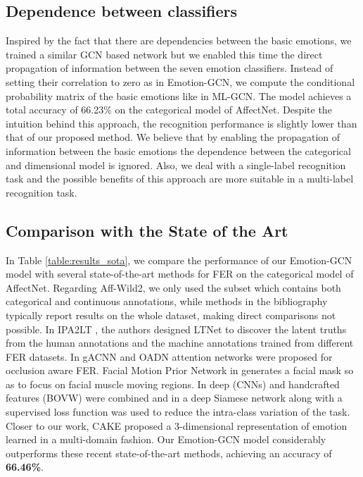 \documentclass[a4paper, 10pt, conference]{ieeeconf}      \usepackage{FG2021}
\begin{document}
\subsection{Dependence between classifiers}

Inspired by the fact that there are dependencies between the basic emotions, we trained a similar GCN based network but we enabled this time the direct propagation of information between the seven emotion classifiers. Instead of setting their correlation to zero as in Emotion-GCN, we compute the conditional probability matrix of the basic emotions like in ML-GCN. The model achieves a total accuracy of 66.23\% on the categorical model of AffectNet. Despite the intuition behind this approach, the recognition performance is slightly lower than that of our proposed method. We believe that by enabling the propagation of information between the basic emotions the dependence between the categorical and dimensional model is ignored. Also, we deal with a single-label recognition task and the possible benefits of this approach are more suitable in a multi-label recognition task.

\subsection{Comparison with the State of the Art}
In Table \ref{table:results_sota}, we compare the performance of our Emotion-GCN model with several state-of-the-art methods for FER on the categorical model of AffectNet. Regarding Aff-Wild2, we only used the subset which contains both categorical and continuous annotations, while methods in the bibliography typically report results on the whole dataset, making direct comparisons not possible. In IPA2LT \cite{zeng2018facial}, the authors designed LTNet to discover the latent truths from the human annotations and the machine annotations trained from different FER datasets. In gACNN \cite{li2018occlusion} and OADN \cite{ding2020occlusion} attention networks were proposed for occlusion aware FER. Facial Motion Prior Network in \cite{chen2019facial} generates a facial mask so as to focus on facial muscle moving regions. In \cite{georgescu2019local} deep (CNNs) and handcrafted features (BOVW) were combined and in \cite{hayale2019facial} a deep Siamese network along with a supervised loss function was used to reduce the intra-class variation of the task. Closer to our work, CAKE \cite{kervadec2018cake} proposed a 3-dimensional representation of emotion learned in a multi-domain fashion. Our Emotion-GCN model considerably outperforms these recent state-of-the-art methods, achieving an accuracy of \textbf{66.46\%}. 
\end{document}
